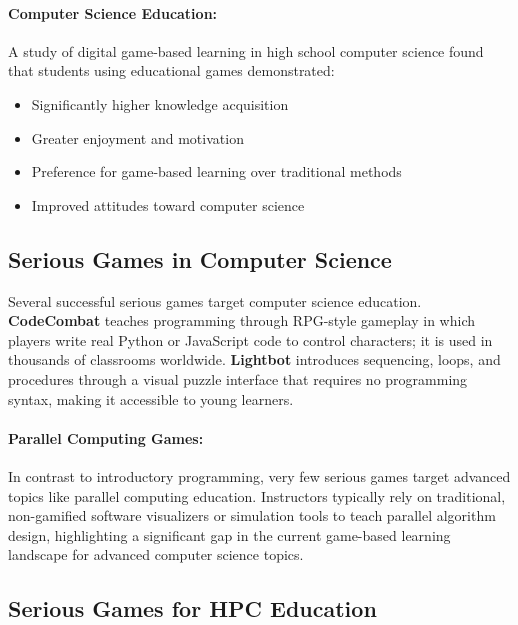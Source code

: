 \paragraph*{\citet{papastergiou2009digital} Computer Science Education:}

A study of digital game-based learning in high school computer science found that students using educational games demonstrated:

\begin{itemize}
    \item Significantly higher knowledge acquisition
    \item Greater enjoyment and motivation
    \item Preference for game-based learning over traditional methods
    \item Improved attitudes toward computer science
\end{itemize}

\subsection{Serious Games in Computer Science}
\label{subsec:games-cs-education}

Several successful serious games target computer science education.
\textbf{CodeCombat} \citep{codecombat} teaches programming through RPG-style gameplay in which players write real Python or JavaScript code to control characters; it is used in thousands of classrooms worldwide.
\textbf{Lightbot} \citep{lightbot} introduces sequencing, loops, and procedures through a visual puzzle interface that requires no programming syntax, making it accessible to young learners.

\paragraph*{Parallel Computing Games:}

In contrast to introductory programming, very few serious games target advanced topics like parallel computing education. Instructors typically rely on traditional, non-gamified software visualizers or simulation tools to teach parallel algorithm design, highlighting a significant gap in the current game-based learning landscape for advanced computer science topics.

\subsection{Serious Games for HPC Education}
\label{subsec:serious-games-hpc}

